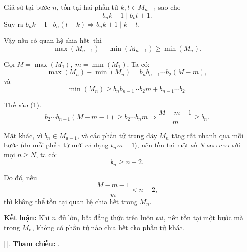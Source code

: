 \documentclass[../2015-n-s.tex]{subfiles}
\begin{document}
\begin{soln}

	Giả sử tại bước \( n \), tồn tại hai phần tử \( k, t \in M_{n-1} \) sao cho
	\[
		b_n k + 1 \mid b_n t + 1.
	\]
	Suy ra \( b_n k + 1 \mid b_n(t - k) \Rightarrow b_n k + 1 \mid k - t \).

	Vậy nếu có quan hệ chia hết, thì
	\[
		\max(M_{n-1}) - \min(M_{n-1}) \geq \min(M_n). \tag{1}
	\]

	Gọi \( M = \max(M_1),\ m = \min(M_1) \). Ta có:
	\[
		\max(M_n) - \min(M_n) = b_n b_{n-1} \cdots b_2 (M - m),
	\]
	và
	\[
		\min(M_n) \geq b_n b_{n-1} \cdots b_2 m + b_{n-1} \cdots b_2.
	\]

	Thế vào (1):
	\[
		b_2 \cdots b_{n-1} (M - m - 1) \geq b_2 \cdots b_n m \Rightarrow \frac{M - m - 1}{m} \geq b_n.
	\]

	Mặt khác, vì \( b_n \in M_{n-1} \), và các phần tử trong dãy \( M_n \) tăng rất nhanh qua mỗi bước (do mỗi phần tử mới có dạng \( b_n m + 1 \)),
	nên tồn tại một số \( N \) sao cho với mọi \( n \geq N \), ta có:
	\[
		b_n \geq n - 2.
	\]

	Do đó, nếu
	\[
		\frac{M - m - 1}{m} < n - 2,
	\]
	thì không thể tồn tại quan hệ chia hết trong \( M_n \).

	\textbf{Kết luận:} Khi \( n \) đủ lớn, bất đẳng thức trên luôn sai, nên tồn tại một bước mà trong \( M_n \), không có phần tử nào chia hết cho phần tử khác.

	\vspace{1em}
	\textbf{[]}.
	\textbf{Tham chiếu:} .
\end{soln}

\end{document}
